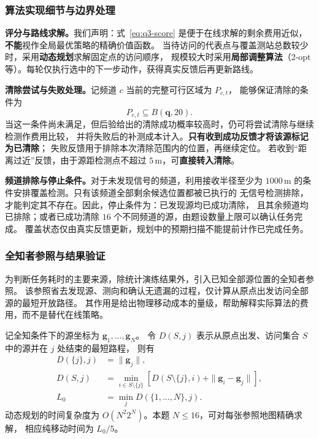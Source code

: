 \documentclass[UTF8,a4paper,12pt]{ctexart}
\begin{document}
\subsubsection{算法实现细节与边界处理}

\textbf{评分与路线求解。}我们声明：式~\eqref{eq:q3-score} 是便于在线求解的剩余费用近似，
\textbf{不能}视作全局最优策略的精确价值函数。
当待访问的代表点与覆盖测站总数较少时，采用\textbf{动态规划}求解固定点的访问顺序，
规模较大时采用\textbf{局部调整算法}（2-opt等）。每轮仅执行选中的下一步动作，获得真实反馈后再更新路线。

\textbf{清除尝试与失败处理。}记频道 $c$ 当前的完整可行区域为 $P_{c,t}$，
能够保证清除的条件为
\begin{equation}
  P_{c,t}\subseteq B(\boldsymbol q,20).
  \label{eq:q3-safe-clear}
\end{equation}
当这一条件尚未满足，但后验给出的清除成功概率较高时，仍可将尝试清除与继续检测作费用比较，
并将失败后的补测成本计入。\textbf{只有收到成功反馈才将该源标记为已清除}；
失败反馈用于排除本次清除范围内的位置，再继续定位。
若收到“距离过近”反馈，由于源距检测点不超过 $5\,\mathrm m$，可\textbf{直接转入清除}。

\textbf{频道排除与停止条件。}对于未发现信号的频道，利用接收半径至少为
$1000\,\mathrm m$ 的条件安排覆盖检测。只有该频道全部剩余候选位置都被已执行的
无信号检测排除，才能判定其不存在。因此，停止条件为：已发现源均已成功清除，
且其余频道均已排除；或者已成功清除 $16$ 个不同频道的源，由题设数量上限可以确认任务完成。
覆盖状态仅由真实反馈更新，规划中的预期扫描不能提前计作已完成任务。

\subsubsection{全知者参照与结果验证}

为判断任务耗时的主要来源，除统计演练结果外，引入已知全部源位置的全知者参照。
该参照省去发现源、测向和确认无遗漏的过程，仅计算从原点出发访问全部源的最短开放路径。
其作用是给出物理移动成本的量级，帮助解释实际算法的费用，而不是替代在线策略。

记全知条件下的源坐标为 $\boldsymbol g_1,\ldots,\boldsymbol g_N$。
令 $D(S,j)$ 表示从原点出发、访问集合 $S$ 中的源并在 $j$ 处结束的最短路程，
则有
\begin{equation}
  \begin{aligned}
    D(\{j\},j)&=\|\boldsymbol g_j\|,\\
    D(S,j)&=\min_{i\in S\setminus\{j\}}
       \left[D(S\setminus\{j\},i)+\|\boldsymbol g_i-\boldsymbol g_j\|\right],\\
    L_0&=\min_j D(\{1,\ldots,N\},j).
  \end{aligned}
  \label{eq:q3-oracle}
\end{equation}
动态规划的时间复杂度为 $O(N^2 2^N)$。本题 $N\leq16$，可对每张参照地图精确求解，
相应纯移动时间为 $L_0/5$。
\end{document}

